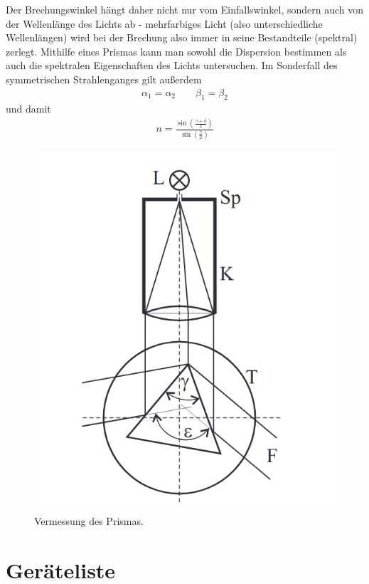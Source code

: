 \documentclass{article}
\begin{document}
Der Brechungswinkel hängt daher nicht nur vom Einfallswinkel, sondern auch von der Wellenlänge des Lichts ab - mehrfarbiges Licht (also unterschiedliche Wellenlängen) wird bei der Brechung also immer in seine Bestandteile (spektral) zerlegt. Mithilfe eines Prismas kann man sowohl die Dispersion bestimmen als auch die spektralen Eigenschaften des Lichts untersuchen. Im Sonderfall des symmetrischen Strahlenganges gilt außerdem
\begin{align*}
\alpha_1 = \alpha_2 \qquad \beta_1 = \beta_2
\end{align*}
und damit
\begin{align}
\label{eq:brechung}
n = \frac{\sin\left(\frac{\gamma + \delta}{2}\right)}{\sin\left(\frac{\gamma}{2}\right)}
\end{align}


\begin{figure}[H]
\centering
\includegraphics[scale=1.5]{prisma1.png}
\caption{Vermessung des Prismas.}
\label{fig:prisma}
\end{figure}

\newpage

\section{Geräteliste}
\end{document}
